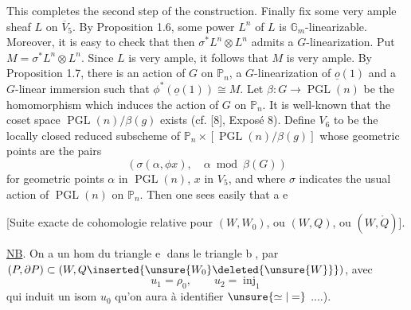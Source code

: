 This completes the second step of the construction. Finally fix some very ample sheaf $L$ on $\overline V_5$. By Proposition 1.6, some power $L^n$ of $L$ is $\mathbb G_m$-linearizable. Moreover, it is easy to check that then $\sigma^*L^n\otimes L^n$ admits a $G$-linearization. Put $M=\sigma^*L^n\otimes L^n$. Since $L$ is very ample, it follows that $M$ is very ample. By Proposition 1.7, there is an action of $G$ on $\mathbb P_n$, a $G$-linearization of $\underline{o}(1)$ and a $G$-linear immersion
such that $\phi^*(\underline{o}(1))\cong M$. Let $\beta:G\longrightarrow\operatorname{PGL}(n)$ be the homomorphism which induces the action of $G$ on $\mathbb P_n$. It is well-known that the coset space $\operatorname{PGL}(n)/\beta(g)$ exists (cf. [8], Exposé 8). Define $V_6$ to be the locally closed reduced subscheme of $\mathbb P_n\times[\operatorname{PGL}(n)/\beta(g)]$ whose geometric points are the pairs
\[
(\sigma(\alpha,\phi x),\quad\alpha\bmod\beta(G))
\]
for geometric points $\alpha$ in $\operatorname{PGL}(n)$, $x$ in $V_5$, and where $\sigma$ indicates the usual action of $\operatorname{PGL}(n)$ on $\mathbb P_n$. Then one sees easily that a
\textcircled{e}

[Suite exacte de cohomologie relative pour $(W,W_0)$, ou $(W,Q)$, ou $(W,\mathring Q)$].

\uline{NB}. On a un hom  du triangle \textcircled{e} dans le triangle \textcircled{b},  par $(P,\partial P)\subset(W,Q\inserted{\unsure{W_0}\deleted{\unsure{W}}})$, avec
\[
u_1=\rho_0,\qquad u_2=\operatorname{inj}_1
\]
qui induit un isom $u_0$ qu'on aura à identifier  $\unsure{\simeq|=}$  ....).

